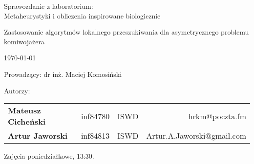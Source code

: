\thispagestyle{empty} %

\begin{center}
{\large{Sprawozdanie z laboratorium:\\
Metaheurystyki i obliczenia inspirowane biologicznie}}

\vspace{3ex}

Zastosowanie algorytmów lokalnego przeszukiwania dla asymetrycznego problemu komiwojażera

\vspace{3ex}
{\footnotesize\today}

\end{center}


\vspace{10ex}

Prowadzący: dr inż. Maciej Komosiński

\vspace{5ex}

Autorzy:
\begin{tabular}{lllr}
\textbf{Mateusz Cicheński} & inf84780 & ISWD & hrkm@poczta.fm \\
\textbf{Artur Jaworski} & inf84813 & ISWD & Artur.A.Jaworski@gmail.com \\
\end{tabular}

\vspace{5ex}

Zajęcia poniedziałkowe, 13:30.


\newpage

